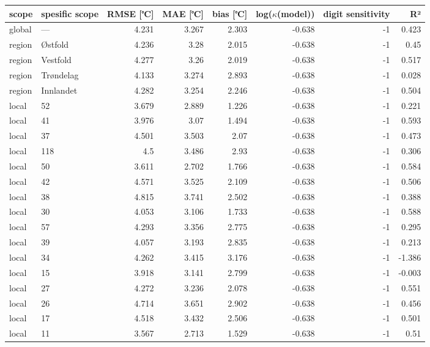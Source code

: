 \begin{tabular}{llrrrrrr}
\hline
 scope   & spesific
scope           &       RMSE
[℃] &   MAE [℃] &       bias
[℃] &   log($\kappa$(model)) &    digit
sensitivity &     R² \\
\hline
 global  & ---       & 4.231 &     3.267 & 2.303 &                 -0.638 & -1 &  0.423 \\
 region  & Østfold   & 4.236 &     3.28  & 2.015 &                 -0.638 & -1 &  0.45  \\
 region  & Vestfold  & 4.277 &     3.26  & 2.019 &                 -0.638 & -1 &  0.517 \\
 region  & Trøndelag & 4.133 &     3.274 & 2.893 &                 -0.638 & -1 &  0.028 \\
 region  & Innlandet & 4.282 &     3.254 & 2.246 &                 -0.638 & -1 &  0.504 \\
 local   & 52        & 3.679 &     2.889 & 1.226 &                 -0.638 & -1 &  0.221 \\
 local   & 41        & 3.976 &     3.07  & 1.494 &                 -0.638 & -1 &  0.593 \\
 local   & 37        & 4.501 &     3.503 & 2.07  &                 -0.638 & -1 &  0.473 \\
 local   & 118       & 4.5   &     3.486 & 2.93  &                 -0.638 & -1 &  0.306 \\
 local   & 50        & 3.611 &     2.702 & 1.766 &                 -0.638 & -1 &  0.584 \\
 local   & 42        & 4.571 &     3.525 & 2.109 &                 -0.638 & -1 &  0.506 \\
 local   & 38        & 4.815 &     3.741 & 2.502 &                 -0.638 & -1 &  0.388 \\
 local   & 30        & 4.053 &     3.106 & 1.733 &                 -0.638 & -1 &  0.588 \\
 local   & 57        & 4.293 &     3.356 & 2.775 &                 -0.638 & -1 &  0.295 \\
 local   & 39        & 4.057 &     3.193 & 2.835 &                 -0.638 & -1 &  0.213 \\
 local   & 34        & 4.262 &     3.415 & 3.176 &                 -0.638 & -1 & -1.386 \\
 local   & 15        & 3.918 &     3.141 & 2.799 &                 -0.638 & -1 & -0.003 \\
 local   & 27        & 4.272 &     3.236 & 2.078 &                 -0.638 & -1 &  0.551 \\
 local   & 26        & 4.714 &     3.651 & 2.902 &                 -0.638 & -1 &  0.456 \\
 local   & 17        & 4.518 &     3.432 & 2.506 &                 -0.638 & -1 &  0.501 \\
 local   & 11        & 3.567 &     2.713 & 1.529 &                 -0.638 & -1 &  0.51  \\
\hline
\end{tabular}